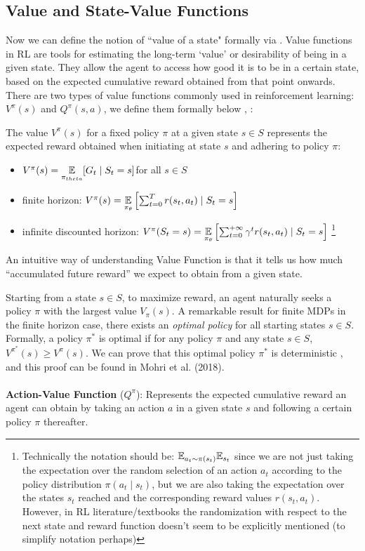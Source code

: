 \subsection{Value and State-Value Functions}

Now we can define the notion of ``value of a state" formally via . Value functions in RL are tools for estimating the long-term `value' or desirability of being in a given state. They allow the agent to access how good it is to be in a certain state, based on the expected cumulative reward obtained from that point onwards. There are two types of value functions commonly used in reinforcement learning: $V^{\pi}(s)$ and $Q^{\pi}(s,a)$, we define them formally below \cite{RL}, \cite{mohri2018}:
\begin{definition}
    The value $V^{\pi}(s)$ for a fixed policy $\pi$ at a given state $s \in S$ represents the expected reward obtained when initiating at state $s$ and adhering to policy $\pi:$
    \begin{itemize}
        \item $V^{\pi}(s) = \underset{\pi_{theta}}{\mathbb E} [G_t \mid S_t = s]$for all $s \in S$ \cite{RL}
        \item finite horizon: $V^{\pi}(s) = \underset{\pi_{\theta}}{\mathbb E} \left[ \sum_{t=0}^T r(s_t,a_t) \mid S_t =s
        \right]$ \cite{mohri2018}
        \item infinite discounted horizon: $V^{\pi}(S_t = s) = \underset{\pi_{\theta}}{\mathbb E} \left[ \sum_{t=0}^{+ \infty} \gamma^t r(s_t,a_t) \mid S_t =s
        \right]$ \cite{mohri2018}     \footnote{Technically the notation should be: $\mathbb E_{a_t \sim \pi(s_t)} \mathbb E_{s_t}$ since
    we are not just taking the expectation over the random selection of an action $a_t$ according to the policy distribution $\pi(a_t \mid s_t)$, but we are also taking the expectation over the states $s_t$ reached and the corresponding reward values $r(s_t, a_t)$. However, in RL literature/textbooks the randomization with respect to the next state and reward function doesn't seem to be  explicitly mentioned (to simplify notation perhaps)} 
    \end{itemize}
\end{definition}
An intuitive way of understanding Value Function is that it tells us how much ``accumulated future reward'' we expect to obtain from a given state.

Starting from a state $s \in S$, to maximize reward, an agent naturally seeks a policy $\pi$ with the largest value $V_{\pi}(s)$. A remarkable result for finite MDPs in the finite horizon case, there exists an \textit{optimal policy} for all starting states $s \in S$. Formally, a policy $\pi^*$ is optimal if for any policy $\pi$ and any state $s \in S$, $V^{\pi^*}(s) \geq  V^{\pi}(s)$. 
We can prove that this optimal policy $\pi^*$ is deterministic \cite{mohri2018}, and this proof can be found in Mohri  et al. (2018). 
\\\
\\
\textbf{Action-Value Function} ($Q^{\pi}$): Represents the expected cumulative reward an agent can obtain by taking an action $a$ in a given state $s$ and following a certain policy $\pi$ thereafter. 

